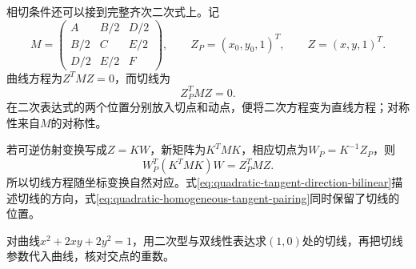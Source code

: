 相切条件还可以接到完整齐次二次式上。记
\begin{equation*}
 M=\begin{pmatrix}A&B/2&D/2\\B/2&C&E/2\\D/2&E/2&F\end{pmatrix},
 \qquad Z_P=(x_0,y_0,1)^T,\qquad Z=(x,y,1)^T.
\end{equation*}
曲线方程为\(Z^TMZ=0\)，而切线为
\begin{equation}\label{eq:quadratic-homogeneous-tangent-pairing}
 Z_P^TMZ=0.
\end{equation}
在二次表达式的两个位置分别放入切点和动点，便将二次方程变为直线方程；对称性来自\(M\)的对称性。

若可逆仿射变换写成\(Z=KW\)，新矩阵为\(K^TMK\)，相应切点为\(W_P=K^{-1}Z_P\)，则
\begin{equation*}
 W_P^T(K^TMK)W=Z_P^TMZ.
\end{equation*}
所以切线方程随坐标变换自然对应。式\eqref{eq:quadratic-tangent-direction-bilinear}描述切线的方向，式\eqref{eq:quadratic-homogeneous-tangent-pairing}同时保留了切线的位置。

\par\noindent\begin{minipage}{\linewidth}
\begin{example}
对曲线\(x^2+2xy+2y^2=1\)，用二次型与双线性表达求\((1,0)\)处的切线，再把切线参数代入曲线，核对交点的重数。
\end{example}
\end{minipage}\par


